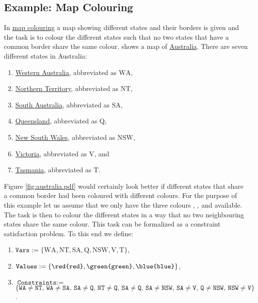 \subsection{Example: Map Colouring}
In \href{https://en.wikipedia.org/wiki/Four_color_theorem}{map colouring} a map showing different states and their
borders is given and the task is to colour the different states such that no two states that have a common
border share the same colour.   shows a map of
\href{https://en.wikipedia.org/wiki/Australia}{Australia}.  There are seven different 
states in Australia:
\begin{enumerate}
\item \href{https://en.wikipedia.org/wiki/Western_Australia}{Western Australia}, abbreviated as $\mathrm{WA}$,
\item \href{https://en.wikipedia.org/wiki/Northern_Territory}{Northern Territory}, abbreviated as $\mathrm{NT}$,
\item \href{https://en.wikipedia.org/wiki/South_Australia}{South Australia}, abbreviated as $\mathrm{SA}$,
\item \href{https://en.wikipedia.org/wiki/Queensland}{Queensland}, abbreviated as $\mathrm{Q}$,
\item \href{https://en.wikipedia.org/wiki/New_South_Wales}{New South Wales}, abbreviated as $\mathrm{NSW}$,
\item \href{https://en.wikipedia.org/wiki/Victoria_(Australia)}{Victoria}, abbreviated as $\mathrm{V}$, and
\item \href{https://en.wikipedia.org/wiki/Tasmania}{Tasmania}, abbreviated as $\mathrm{T}$.
\end{enumerate}
Figure \ref{fig:australia.pdf} would certainly look better if different states that share a common border had
been coloured with different colours.  For the purpose of 
this example let us assume that we only have the three colours , , and 
available.  The task is then to colour the different 
states in a way that no two neighbouring states share the same colour.  This task can be formalized as a
constraint satisfaction problem.  To this end we define: 
\begin{enumerate}
\item $\texttt{Vars} := \{ \mathrm{WA}, \mathrm{NT}, \mathrm{SA}, \mathrm{Q}, \mathrm{NSW}, \mathrm{V}, \mathrm{T} \}$,
\item $\texttt{Values} := \{ \texttt{\red{red}}, \texttt{\green{green}}, \texttt{\blue{blue}} \}$,
\item $\texttt{Constraints} := $ \\[0.2cm]
      \hspace*{0.8cm}
      $\bigl\{ \texttt{WA} \not= \texttt{NT},\, \texttt{WA} \not= \texttt{SA},\, \texttt{SA} \not= \texttt{Q},\, 
                \texttt{NT} \not= \texttt{Q},\,
                \texttt{SA} \not= \texttt{Q},\, \texttt{SA} \not= \texttt{NSW},\, \texttt{SA} \not= \texttt{V},\,
                \texttt{Q} \not= \texttt{NSW},\, \texttt{NSW} \not= \texttt{V}
       \bigr\}$.
\end{enumerate}
